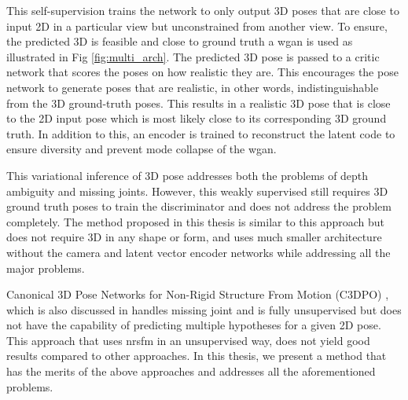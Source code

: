 This self-supervision trains the network to only output 3D poses that are close to input 2D in a particular view but unconstrained from another view. To ensure, the predicted 3D is feasible and close to ground truth a \ac{wgan} is used as illustrated in Fig \ref{fig:multi_arch}. The predicted 3D pose is passed to a critic network that scores the poses on how realistic they are. This encourages the pose network to generate poses that are realistic, in other words, indistinguishable from the 3D ground-truth poses. This results in a realistic 3D pose that is close to the 2D input pose which is most likely close to its corresponding 3D ground truth. In addition to this, an encoder is trained to reconstruct the latent code to ensure diversity and prevent mode collapse of the \ac{wgan}. 

This variational inference of 3D pose addresses both the problems of depth ambiguity and missing joints. However, this weakly supervised still requires 3D ground truth poses to train the discriminator and does not address the problem completely. The method proposed in this thesis is similar to this approach but does not require 3D in any shape or form, and uses much smaller architecture without the camera and latent vector encoder networks while addressing all the major problems. 

Canonical 3D Pose Networks for Non-Rigid Structure From Motion (C3DPO) \cite{c3dpo}, which is also discussed in  handles missing joint and is fully unsupervised but does not have the capability of predicting multiple hypotheses for a given 2D pose. This approach that uses \ac{nrsfm} in an unsupervised way, does not yield good results compared to other approaches. In this thesis, we present a method that has the merits of the above approaches and addresses all the aforementioned problems.